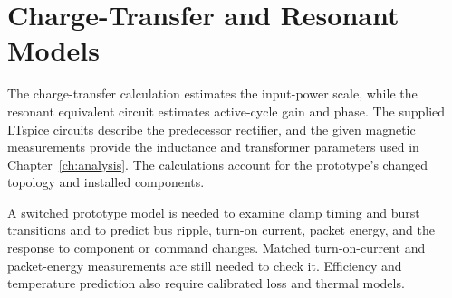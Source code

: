 \section{Charge-Transfer and Resonant Models}
\label{sec:sim-objectives}

The charge-transfer calculation estimates the input-power scale, while the resonant equivalent circuit estimates active-cycle gain and phase. The supplied LTspice circuits describe the predecessor rectifier, and the given magnetic measurements provide the inductance and transformer parameters used in Chapter~\ref{ch:analysis}. The calculations account for the prototype's changed topology and installed components.

A switched prototype model is needed to examine clamp timing and burst transitions and to predict bus ripple, turn-on current, packet energy, and the response to component or command changes. Matched turn-on-current and packet-energy measurements are still needed to check it. Efficiency and temperature prediction also require calibrated loss and thermal models.
